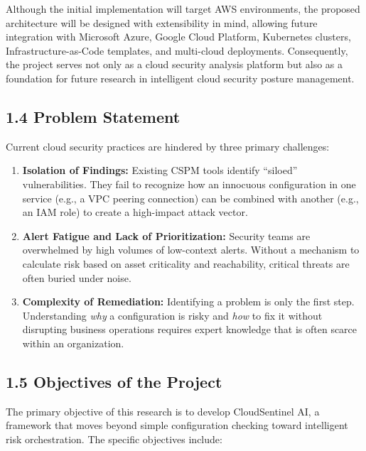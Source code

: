 Although the initial implementation will target AWS environments, the proposed architecture will be designed with extensibility in mind, allowing future integration with Microsoft Azure, Google Cloud Platform, Kubernetes clusters, Infrastructure-as-Code templates, and multi-cloud deployments. Consequently, the project serves not only as a cloud security analysis platform but also as a foundation for future research in intelligent cloud security posture management.

\subsection{1.4 Problem Statement}

Current cloud security practices are hindered by three primary challenges:

\begin{enumerate}
\def\labelenumi{\arabic{enumi}.}
\tightlist
\item
  \textbf{Isolation of Findings:} Existing CSPM tools identify ``siloed'' vulnerabilities. They fail to recognize how an innocuous configuration in one service (e.g., a VPC peering connection) can be combined with another (e.g., an IAM role) to create a high-impact attack vector.\\
\item
  \textbf{Alert Fatigue and Lack of Prioritization:} Security teams are overwhelmed by high volumes of low-context alerts. Without a mechanism to calculate risk based on asset criticality and reachability, critical threats are often buried under noise.\\
\item
  \textbf{Complexity of Remediation:} Identifying a problem is only the first step. Understanding \emph{why} a configuration is risky and \emph{how} to fix it without disrupting business operations requires expert knowledge that is often scarce within an organization.
\end{enumerate}

\subsection{1.5 Objectives of the Project}

The primary objective of this research is to develop CloudSentinel AI, a framework that moves beyond simple configuration checking toward intelligent risk orchestration. The specific objectives include:

